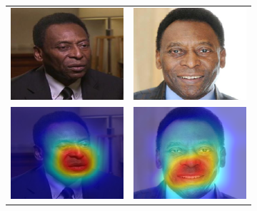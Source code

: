 \begin{figure}[t]
\begin{subfigure}[b]{.48\columnwidth}
\begin{tabular}{cc}
        \end{tabular}
    \end{subfigure}
    \begin{subfigure}[b]{.48\columnwidth}
        \centering
        \begin{tabular}{cc}
            \includegraphics[width=.45\columnwidth]{figures/chapter7/clarification/faces/1_im.png} &  
            \includegraphics[width=.45\columnwidth]{figures/chapter7/clarification/faces/2_im.png}\\
            \includegraphics[width=.45\columnwidth]{figures/chapter7/clarification/faces/1_hm.png} &  
            \includegraphics[width=.45\columnwidth]{figures/chapter7/clarification/faces/2_hm.png}

\end{tabular}
\end{subfigure}
\end{figure}
